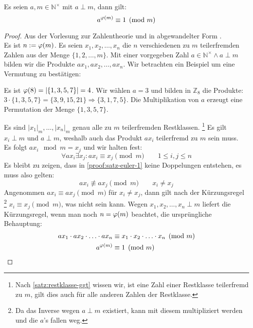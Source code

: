 \begin{satz}
  Es seien $a,m \in \mathbb{N}^\times$ mit $a \perp m$, dann gilt:
  \begin{equation*}
    a^{\varphi(m)} \equiv 1 \pmod{m}
  \end{equation*}
\end{satz}
\begin{proof}
  Aus der Vorlesung zur Zahlentheorie \parencite{SITE:phi-euler-fermat} und in
  abgewandelter Form \parencite[187-188]{BOOK:numberTheory}. \\
  Es ist $n := \varphi(m)$. Es seien $x_1,x_2,\ldots,x_n$ die $n$ verschiedenen zu
  $m$ teilerfremden Zahlen aus der Menge $\{1,2,\ldots,m\}$.
  Mit einer vorgegeben Zahl
  $a \in \mathbb{N}^\times \wedge a \perp m$ bilden wir die Produkte $ax_1,ax_2,\ldots,ax_n$.
  Wir betrachten ein Beispiel um eine Vermutung zu bestätigen:
  \begin{example}
    Es ist $\varphi(8) = |\{1,3,5,7\}| = 4$. Wir wählen $a = 3$ und bilden in $\mathbb{Z}_8$ die Produkte:
    $3\cdot \{1,3,5,7\} = \{3,9,15,21\} \Rightarrow \{3,1,7,5\}$. Die Multiplikation von $a$ erzeugt eine
    Permutation der Menge $\{1,3,5,7\}$.
  \end{example}
  \noindent
  Es sind $|x_1|_m,\ldots,|x_n|_m$ genau alle zu $m$ teilerfremden Restklassen.
  \footnote{
    Nach \autoref{satz:restklasse-ggt} wissen wir, ist eine Zahl einer Restklasse teilerfremd zu $m$,
    gilt dies auch für alle anderen Zahlen der Restklasse.
  }
  Es gilt $x_i \perp m$ und $a \perp m$, weshalb auch das Produkt $ax_i$ teilerfremd zu $m$ sein muss.\\
  Es folgt $ax_i \mod{m} = x_j$ und wir halten fest:
  \begin{equation}
    \label{proof:satz-euler-1}
    \forall ax_i \exists x_j: ax_i \equiv x_j \pmod{m} \qquad 1 \leq i,j \leq n \tag{$*$}
  \end{equation}
  Es bleibt zu zeigen, dass in \eqref{proof:satz-euler-1} keine Doppelungen entstehen, es muss
  also gelten:
  \begin{equation*}
    ax_i \not\equiv ax_j \pmod{m} \qquad x_i \neq x_j
  \end{equation*}
  Angenommen $ax_i \equiv ax_j \pmod{m}$ für $x_i \neq x_j$, dann gilt nach der Kürzungsregel
  \footnote{
    Da das Inverse wegen $a \perp m$ existiert, kann mit diesem multipliziert werden und die $a$'s
    fallen weg.
  }
  $x_i \equiv x_j \pmod{m}$, was nicht sein kann.
  Wegen $x_1,x_2,\ldots,x_n \perp m$ liefert die Kürzungsregel, wenn man noch
  $n = \varphi(m)$ beachtet, die ursprüngliche Behauptung:
  \begin{align*}
    ax_1 \cdot ax_2 \cdot \ldots \cdot ax_n & \equiv
    x_1 \cdot x_2 \cdot \ldots \cdot x_n  \pmod{m}              \\
    a^{\varphi(m)}                            & \equiv 1 \pmod{m}
  \end{align*}
\end{proof}

